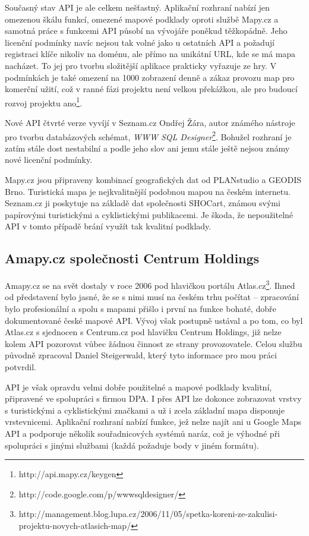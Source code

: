 Současný stav API je ale celkem nešťastný. Aplikační rozhraní nabízí
jen omezenou škálu funkcí, omezené mapové podklady oproti službě
Mapy.cz a samotná práce s funkcemi API působí na vývojáře poněkud
těžkopádně. Jeho licenční podmínky navíc nejsou tak volné jako u
ostatních API a požadují registraci klíče nikoliv na doménu, ale
přímo na unikátní URL, kde se má mapa nacházet. To jej pro tvorbu
složitější aplikace prakticky vyřazuje ze hry. V podmínkách je také
omezení na 1000 zobrazení denně a zákaz provozu map pro komerční
užití, což v ranné fázi projektu není velkou překážkou, ale pro
budoucí rozvoj projektu ano\footnote{http://api.mapy.cz/keygen}.

Nové API čtvrté verze vyvíjí v Seznam.cz Ondřej Žára, autor známého
nástroje pro tvorbu databázových schémat, {\it WWW SQL
Designer}\footnote{http://code.google.com/p/wwwsqldesigner/}. Bohužel
rozhraní je zatím stále dost nestabilní a podle jeho slov ani jemu
stále ještě nejsou známy nové licenční podmínky.

Mapy.cz jsou připraveny kombinací geografických dat od PLANstudio a
GEODIS Brno. Turistická mapa je nejkvalitnější podobnou mapou na českém
internetu. Seznam.cz ji poskytuje na základě dat společnosti SHOCart,
známou svými papírovými turistickými a cyklistickými publikacemi. Je
škoda, že nepoužitelné API v tomto případě brání využít tak kvalitní
podklady.

\subsection{Amapy.cz společnosti Centrum Holdings}
Amapy.cz se na svět dostaly v roce 2006 pod hlavičkou portálu
Atlas.cz\footnote{http://management.blog.lupa.cz/2006/11/05/spetka-koreni-ze-zakulisi-projektu-novych-atlasich-map/}.
Ihned od představení bylo jasné, že se s nimi musí na českém
trhu počítat -- zpracování bylo profesionální a spolu s mapami přišlo
i první na funkce bohaté, dobře dokumentované české mapové API. Vývoj
však postupně ustával a po tom, co byl Atlas.cz s sjednocen s
Centrum.cz pod hlavičku Centrum Holdings, již nelze kolem API
pozorovat vůbec žádnou činnost ze strany provozovatele. Celou službu
původně zpracoval Daniel Steigerwald, který tyto informace pro mou
práci potvrdil.

API je však opravdu velmi dobře použitelné a mapové podklady
kvalitní, připravené ve spolupráci s firmou DPA. I přes API lze
dokonce zobrazovat vrstvy s turistickými a cyklistickými značkami a už i
zcela základní mapa disponuje vrstevnicemi. Aplikační rozhraní nabízí
funkce, jež nelze najít ani u Google Maps API a podporuje několik
souřadnicových systémů naráz, což je výhodné při spolupráci s jinými
službami (každá požaduje body v jiném formátu).

